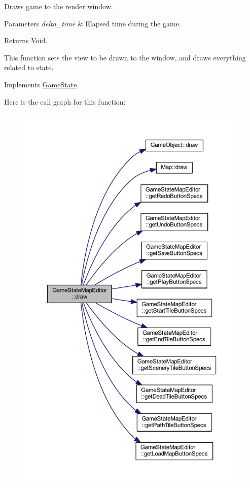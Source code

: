 Draws game to the render window. 


\begin{DoxyParams}{Parameters}
{\em delta\+\_\+time} & Elapsed time during the game. \\
\hline
\end{DoxyParams}
\begin{DoxyReturn}{Returns}
Void.
\end{DoxyReturn}
This function sets the view to be drawn to the window, and draws everything related to state. 

Implements \hyperlink{class_game_state_a55a6a68aabdf7054ea0e6ddbf24902df}{Game\+State}.



Here is the call graph for this function\+:\nopagebreak
\begin{figure}[H]
\begin{center}
\leavevmode
\includegraphics[height=550pt]{class_game_state_map_editor_a37c87643309459ac32d0b5f608bc93b0_cgraph}
\end{center}
\end{figure}


